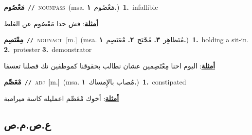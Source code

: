 \documentclass[10pt,a4paper,twoside]{article} %
\begin{document}
\begin{multicols}{2}
{\setlength\topsep{0pt}\textbf{\foreignlanguage{arabic}{مَعْصُوم}}\ {\color{gray}\texttt{//}\color{black}}\ \textsc{noun\textunderscore pass}\ \color{gray}(msa. \foreignlanguage{arabic}{مَعْصُوم}~\foreignlanguage{arabic}{\textbf{١.}})\color{black}\ \textbf{1.}~infallible\  \begin{flushright}\color{gray}\foreignlanguage{arabic}{\textbf{\underline{\foreignlanguage{arabic}{أمثلة}}}: فش حدا مَعْصُوم عن الغلط}\end{flushright}\color{black}} \vspace{2mm}

{\setlength\topsep{0pt}\textbf{\foreignlanguage{arabic}{مِعْتَصِم}}\ {\color{gray}\texttt{//}\color{black}}\ \textsc{noun\textunderscore act}\ [m.]\ \color{gray}(msa. \foreignlanguage{arabic}{مُتَظاهِر}~\foreignlanguage{arabic}{\textbf{٣.}}  \foreignlanguage{arabic}{مُحْتَج}~\foreignlanguage{arabic}{\textbf{٢.}}  \foreignlanguage{arabic}{مْعَتَصِم}~\foreignlanguage{arabic}{\textbf{١.}})\color{black}\ \textbf{1.}~holding a sit-in.  \textbf{2.}~protester  \textbf{3.}~demonstrator\  \begin{flushright}\color{gray}\foreignlanguage{arabic}{\textbf{\underline{\foreignlanguage{arabic}{أمثلة}}}: اليوم احنا مِعْتَصِمين عشان نطالب بحقوقنا كموظفين تك فصلنا تعسفا}\end{flushright}\color{black}} \vspace{2mm}

{\setlength\topsep{0pt}\textbf{\foreignlanguage{arabic}{مْعَصِّم}}\ {\color{gray}\texttt{//}\color{black}}\ \textsc{adj}\ [m.]\ \color{gray}(msa. \foreignlanguage{arabic}{مُصاب بالإِمساك}~\foreignlanguage{arabic}{\textbf{١.}})\color{black}\ \textbf{1.}~constipated\  \begin{flushright}\color{gray}\foreignlanguage{arabic}{\textbf{\underline{\foreignlanguage{arabic}{أمثلة}}}: أخوك مْعَصِّم اعمليله كاسة ميرامية}\end{flushright}\color{black}} \vspace{2mm}

\vspace{-3mm}
\subsection*{\color{blue}\foreignlanguage{arabic}{ع.ص.م.ص}\color{blue}{ (ntws)}} 


\end{multicols}
\end{document}
